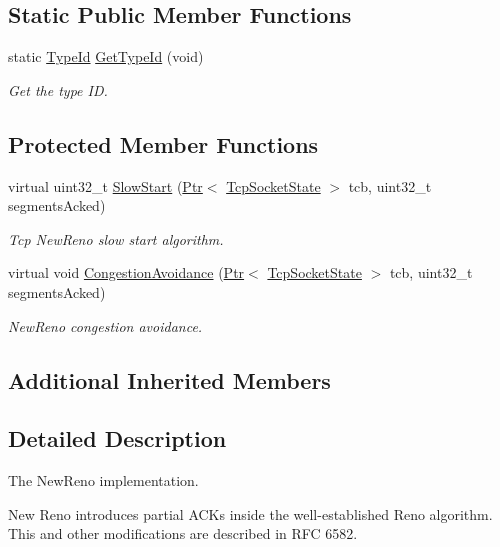 \subsection*{Static Public Member Functions}
\begin{DoxyCompactItemize}
\item 
static \hyperlink{classns3_1_1TypeId}{Type\+Id} \hyperlink{classns3_1_1TcpNewReno_af4f4778f724f72a8a441ac0af4cdd8fe}{Get\+Type\+Id} (void)
\begin{DoxyCompactList}\small\item\em Get the type ID. \end{DoxyCompactList}\end{DoxyCompactItemize}
\subsection*{Protected Member Functions}
\begin{DoxyCompactItemize}
\item 
virtual uint32\+\_\+t \hyperlink{classns3_1_1TcpNewReno_a1cf5fd9585eb3b745727f4f5beae0706}{Slow\+Start} (\hyperlink{classns3_1_1Ptr}{Ptr}$<$ \hyperlink{classns3_1_1TcpSocketState}{Tcp\+Socket\+State} $>$ tcb, uint32\+\_\+t segments\+Acked)
\begin{DoxyCompactList}\small\item\em Tcp New\+Reno slow start algorithm. \end{DoxyCompactList}\item 
virtual void \hyperlink{classns3_1_1TcpNewReno_a34a5eec0649a7b485852c74c825e14ba}{Congestion\+Avoidance} (\hyperlink{classns3_1_1Ptr}{Ptr}$<$ \hyperlink{classns3_1_1TcpSocketState}{Tcp\+Socket\+State} $>$ tcb, uint32\+\_\+t segments\+Acked)
\begin{DoxyCompactList}\small\item\em New\+Reno congestion avoidance. \end{DoxyCompactList}\end{DoxyCompactItemize}
\subsection*{Additional Inherited Members}


\subsection{Detailed Description}
The New\+Reno implementation. 

New Reno introduces partial A\+C\+Ks inside the well-\/established Reno algorithm. This and other modifications are described in R\+FC 6582.

